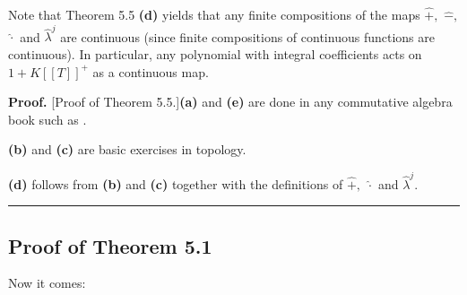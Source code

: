 \documentclass[numbers=enddot,12pt,final,onecolumn,notitlepage]{scrartcl}%
\newenvironment{proof}[1][Proof]{\noindent\textbf{#1.} }{\ \rule{0.5em}{0.5em}}
\begin{document}
Note that Theorem 5.5 \textbf{(d)} yields that any finite compositions of the
maps $\widehat{+},$ $\widehat{-},$ $\widehat{\cdot}$ and $\widehat{\lambda
}^{j}$ are continuous (since finite compositions of continuous functions are
continuous). In particular, any polynomial with integral coefficients acts on
$1+K\left[  \left[  T\right]  \right]  ^{+}$ as a continuous map.

\begin{proof}
[Proof of Theorem 5.5.]\textbf{(a)} and \textbf{(e)} are done in any
commutative algebra book such as \cite[Chapter 10]{AtiMac69}.

\textbf{(b)} and \textbf{(c)} are basic exercises in topology.

\textbf{(d)} follows from \textbf{(b)} and \textbf{(c)} together with the
definitions of $\widehat{+},$ $\widehat{\cdot}$ and $\widehat{\lambda}^{j}$.
\end{proof}

\subsection{Proof of Theorem 5.1}

Now it comes:
\end{document}

